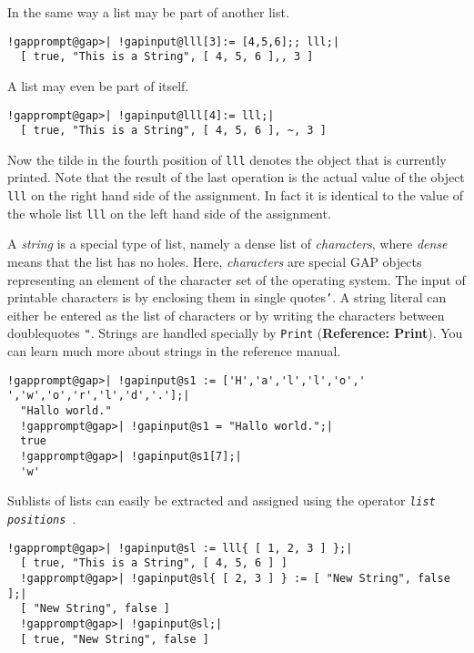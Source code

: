 \documentclass[a4paper,11pt]{report}
\begin{document}
{{ In the same way a list may be part of another list. 

 
\begin{Verbatim}[commandchars=!@|,fontsize=\small,frame=single,label=Example]
  !gapprompt@gap>| !gapinput@lll[3]:= [4,5,6];; lll;|
  [ true, "This is a String", [ 4, 5, 6 ],, 3 ]
\end{Verbatim}
 

 A list may even be part of itself. 

 
\begin{Verbatim}[commandchars=!@|,fontsize=\small,frame=single,label=Example]
  !gapprompt@gap>| !gapinput@lll[4]:= lll;|
  [ true, "This is a String", [ 4, 5, 6 ], ~, 3 ]
\end{Verbatim}
 

 Now the tilde in the fourth position of \texttt{lll} denotes the object that is currently printed. Note that the result of the last
operation is the actual value of the object \texttt{lll} on the right hand side of the assignment. In fact it is identical to the value
of the whole list \texttt{lll} on the left hand side of the assignment. 

   A \emph{string} is a special type of list, namely a dense list of \emph{characters}, where \emph{dense} means that the list has no holes. Here, \emph{characters} are special \textsf{GAP} objects representing an element of the character set of the operating system.
The input of printable characters is by enclosing them in single
quotes{\nobreakspace}\texttt{'}. A string literal can either be entered as the list of characters or by
writing the characters between doublequotes \texttt{"}. Strings are handled specially by \texttt{Print} (\textbf{Reference: Print}). You can learn much more about strings in the reference manual. 

 
\begin{Verbatim}[commandchars=!@|,fontsize=\small,frame=single,label=Example]
  !gapprompt@gap>| !gapinput@s1 := ['H','a','l','l','o',' ','w','o','r','l','d','.'];|
  "Hallo world."
  !gapprompt@gap>| !gapinput@s1 = "Hallo world.";|
  true
  !gapprompt@gap>| !gapinput@s1[7];|
  'w'
\end{Verbatim}
 

 Sublists of lists can easily be extracted and assigned using the operator \texttt{\mbox{\texttt{\mdseries\slshape list}}\texttt{} \mbox{\texttt{\mdseries\slshape positions}} \texttt{}}. 

 
\begin{Verbatim}[commandchars=!@|,fontsize=\small,frame=single,label=Example]
  !gapprompt@gap>| !gapinput@sl := lll{ [ 1, 2, 3 ] };|
  [ true, "This is a String", [ 4, 5, 6 ] ]
  !gapprompt@gap>| !gapinput@sl{ [ 2, 3 ] } := [ "New String", false ];|
  [ "New String", false ]
  !gapprompt@gap>| !gapinput@sl;|
  [ true, "New String", false ]
\end{Verbatim}
 

}}
\end{document}
